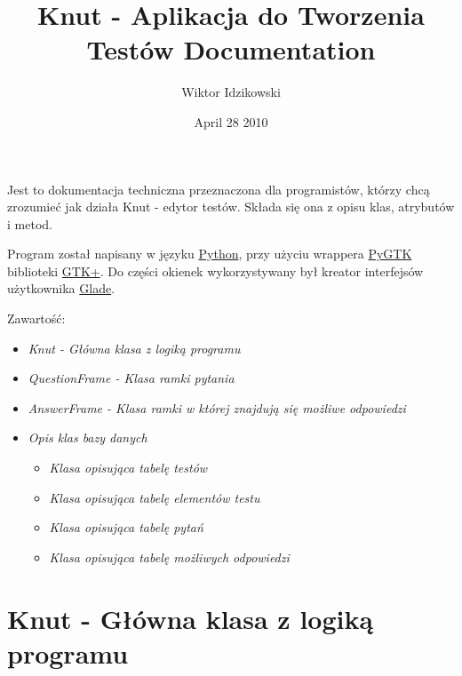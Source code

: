 \documentclass[letterpaper,10pt,polish]{manual}
\title{Knut - Aplikacja do Tworzenia Testów Documentation}
\date{April 28 2010}
\author{Wiktor Idzikowski}
\begin{document}
\maketitle
\tableofcontents
\hypertarget{--doc-index}{}


Jest to dokumentacja techniczna przeznaczona dla programistów, którzy chcą zrozumieć jak działa Knut - edytor testów. Składa się ona z opisu klas, atrybutów i metod.

Program został napisany w języku \href{http://python.org}{Python}, przy użyciu wrappera \href{http://www.pygtk.org}{PyGTK} biblioteki \href{http://gtk.org}{GTK+}. Do części okienek wykorzystywany był kreator interfejsów użytkownika \href{http://glade.gnome.org}{Glade}.

Zawartość:
\begin{itemize}
\item {} 
\emph{Knut - Główna klasa z logiką programu}

\item {} 
\emph{QuestionFrame - Klasa ramki pytania}

\item {} 
\emph{AnswerFrame - Klasa ramki w której znajdują się możliwe odpowiedzi}

\item {} 
\emph{Opis klas bazy danych}
\begin{itemize}
\item {} 
\emph{Klasa opisująca tabelę testów}

\item {} 
\emph{Klasa opisująca tabelę elementów testu}

\item {} 
\emph{Klasa opisująca tabelę pytań}

\item {} 
\emph{Klasa opisująca tabelę możliwych odpowiedzi}

\end{itemize}

\end{itemize}
\hypertarget{knut}{}

\chapter{Knut - Główna klasa z logiką programu}
\hypertarget{module-Knut}{}
\modulesynopsis{}
\end{document}
